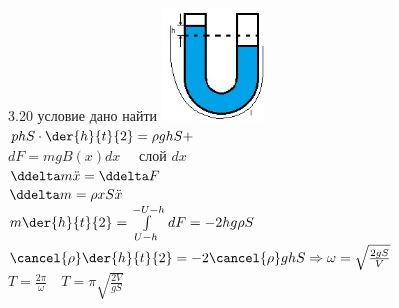 \testCom
{%
	3.20
}
{%
	условие
}
{%
	дано
}
{%
	найти
}
{%
	\includegraphics[height=30mm]{3_20.jpg}\\
	$phS \cdot \der{h}{t}{2} = \rho ghS + $\\
	$dF = mg B(x) dx \quad$ слой $dx$\\
	$\ddelta m \ddot x = \ddelta F$\\
	$\ddelta m = \rho x S \ddot x$\\
	$m \der{h}{t}{2} = \int\limits_{U - h}^{-U-h}\, dF = -2hg\rho S$\\
	$\cancel{\rho} \der{h}{t}{2} = -2 \cancel{\rho} ghS \Rightarrow \omega = \sqrt{\frac{2gS}{V}}$\\
	$T = \frac{2 \pi}{\omega} \quad T = \pi \sqrt{\frac{2V}{gS}}$\\
}

